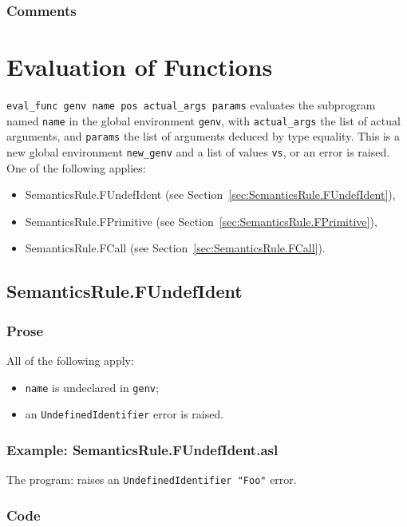 \documentclass{book}
\begin{document}
    \subsection{Comments}

\chapter{Evaluation of Functions \label{chap:eval_func}}
\texttt{eval\_func genv name pos actual\_args params} evaluates the subprogram
named \texttt{name} in the global environment \texttt{genv}, with
\texttt{actual\_args} the list of actual arguments, and \texttt{params} the
list of arguments deduced by type equality. This is a new global environment
\texttt{new\_genv} and a list of values \texttt{vs}, or an error is raised.
One of the following applies:
\begin{itemize}
\item SemanticsRule.FUndefIdent (see Section~\ref{sec:SemanticsRule.FUndefIdent}),
\item SemanticsRule.FPrimitive (see Section~\ref{sec:SemanticsRule.FPrimitive}),
\item SemanticsRule.FCall (see Section~\ref{sec:SemanticsRule.FCall}).
\end{itemize}

\section{SemanticsRule.FUndefIdent \label{sec:SemanticsRule.FUndefIdent}}

  \subsection{Prose}
  All of the following apply:
  \begin{itemize}
  \item \texttt{name} is undeclared in \texttt{genv};
  \item an \texttt{UndefinedIdentifier} error is raised.
  \end{itemize}

  \subsection{Example: SemanticsRule.FUndefIdent.asl}
  The program:
  raises an \texttt{UndefinedIdentifier "Foo"} error.

  \subsection{Code}
\end{document}
